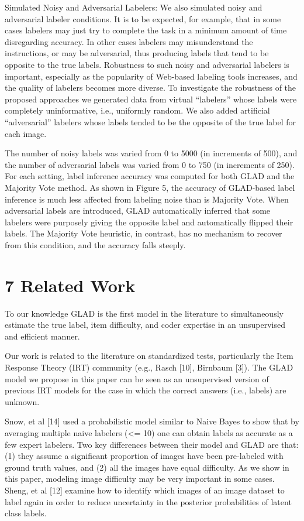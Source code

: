 \documentclass[
]{article}
\begin{document}
Simulated Noisy and Adversarial Labelers: We also simulated noisy and
adversarial labeler conditions. It is to be expected, for example, that
in some cases labelers may just try to complete the task in a minimum
amount of time disregarding accuracy. In other cases labelers may
misunderstand the instructions, or may be adversarial, thus producing
labels that tend to be opposite to the true labels. Robustness to such
noisy and adversarial labelers is important, especially as the
popularity of Web-based labeling tools increases, and the quality of
labelers becomes more diverse. To investigate the robustness of the
proposed approaches we generated data from virtual ``labelers'' whose
labels were completely uninformative, i.e., uniformly random. We also
added artificial ``adversarial'' labelers whose labels tended to be the
opposite of the true label for each image.

The number of noisy labels was varied from 0 to 5000 (in increments of
500), and the number of adversarial labels was varied from 0 to 750 (in
increments of 250). For each setting, label inference accuracy was
computed for both GLAD and the Majority Vote method. As shown in Figure
5, the accuracy of GLAD-based label inference is much less affected from
labeling noise than is Majority Vote. When adversarial labels are
introduced, GLAD automatically inferred that some labelers were
purposely giving the opposite label and automatically flipped their
labels. The Majority Vote heuristic, in contrast, has no mechanism to
recover from this condition, and the accuracy falls steeply.

\section{7 Related Work}\label{related-work}

To our knowledge GLAD is the first model in the literature to
simultaneously estimate the true label, item difficulty, and coder
expertise in an unsupervised and efficient manner.

Our work is related to the literature on standardized tests,
particularly the Item Response Theory (IRT) community (e.g., Rasch
{[}10{]}, Birnbaum {[}3{]}). The GLAD model we propose in this paper can
be seen as an unsupervised version of previous IRT models for the case
in which the correct answers (i.e., labels) are unknown.

Snow, et al {[}14{]} used a probabilistic model similar to Naive Bayes
to show that by averaging multiple naive labelers (\textless= 10) one
can obtain labels as accurate as a few expert labelers. Two key
differences between their model and GLAD are that: (1) they assume a
significant proportion of images have been pre-labeled with ground truth
values, and (2) all the images have equal difficulty. As we show in this
paper, modeling image difficulty may be very important in some cases.
Sheng, et al {[}12{]} examine how to identify which images of an image
dataset to label again in order to reduce uncertainty in the posterior
probabilities of latent class labels.
\end{document}
